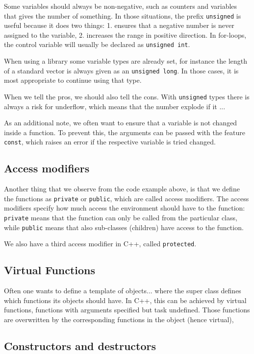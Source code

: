 Some variables should always be non-negative, such as counters and variables that gives the number of something. In those situations, the prefix \texttt{unsigned} is useful because it does two things: 1. ensures that a negative number is never assigned to the variable, 2. increases the range in positive direction. In for-loops, the control variable will usually be declared as \texttt{unsigned int}.

When using a library some variable types are already set, for instance the length of a standard vector is always given as an \texttt{unsigned long}. In those cases, it is most appropriate to continue using that type. 

When we tell the pros, we should also tell the cons. With \texttt{unsigned} types there is always a risk for underflow, which means that the number explode if it ...

As an additional note, we often want to ensure that a variable is not changed inside a function. To prevent this, the arguments can be passed with the feature \texttt{const}, which raises an error if the respective variable is tried changed. 

\subsection{Access modifiers}
Another thing that we observe from the code example above, is that we define the functions as \texttt{private} or \texttt{public}, which are called access modifiers. The access modifiers specify how much access the environment should have to the function: \texttt{private} means that the function can only be called from the particular class, while \texttt{public} means that also sub-classes (children) have access to the function. 

We also have a third access modifier in C++, called \texttt{protected}. 

\subsection{Virtual Functions}
Often one wants to define a template of objects... where the super class defines which functions its objects should have. In C++, this can be achieved by virtual functions, functions with arguments specified but task undefined. Those functions are overwritten by the corresponding functions in the object (hence virtual), 

\subsection{Constructors and destructors}

